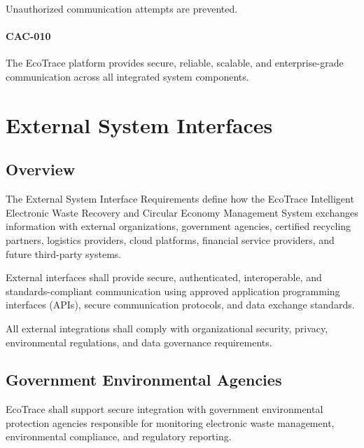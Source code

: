 Unauthorized communication attempts are prevented.

\paragraph{CAC-010}

The EcoTrace platform provides secure, reliable, scalable, and
enterprise-grade communication across all integrated system components.


\section{External System Interfaces}

\subsection{Overview}

The External System Interface Requirements define how the EcoTrace
Intelligent Electronic Waste Recovery and Circular Economy Management
System exchanges information with external organizations, government
agencies, certified recycling partners, logistics providers, cloud
platforms, financial service providers, and future third-party systems.

External interfaces shall provide secure, authenticated, interoperable,
and standards-compliant communication using approved application
programming interfaces (APIs), secure communication protocols, and data
exchange standards.

All external integrations shall comply with organizational security,
privacy, environmental regulations, and data governance requirements.


\subsection{Government Environmental Agencies}

EcoTrace shall support secure integration with government environmental
protection agencies responsible for monitoring electronic waste
management, environmental compliance, and regulatory reporting.


